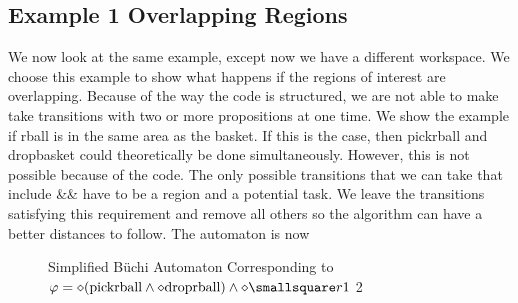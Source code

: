 \subsection{Example 1 Overlapping Regions}
We now look at the same example, except now we have a different workspace. We choose this example to show what happens if the regions of interest are overlapping. Because of the way the code is structured, we are not able to make take transitions with two or more propositions at one time. We show the example if rball is in the same area as the basket. If this is the case, then pickrball and dropbasket could theoretically be done simultaneously. However, this is not possible because of the code. The only possible transitions that we can take that include \&\& have to be a region and a potential task. We leave the transitions satisfying this requirement and remove all others so the algorithm can have a better distances to follow. The automaton is now
\begin{figure}
\centering
{}
\caption{Simplified B\"uchi Automaton Corresponding to $\varphi = \diamond (\text{pickrball} \wedge \diamond \text{droprball}) \wedge \diamond \smallsquare r1$ 2}
\label{fig:ex1OverlapSimplifiedBuchi}
\end{figure} 

